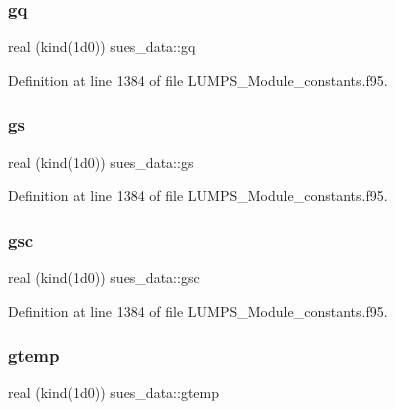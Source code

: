 \mbox{\label{namespacesues__data_a3ad79feef0770aefcae45775fa0c22c8}} 
\subsubsection{\texorpdfstring{gq}{gq}}
{\footnotesize\ttfamily real (kind(1d0)) sues\+\_\+data\+::gq}



Definition at line 1384 of file L\+U\+M\+P\+S\+\_\+\+Module\+\_\+constants.\+f95.

\mbox{\label{namespacesues__data_a5eb7587d26ec3542141102660d22dd33}} 
\subsubsection{\texorpdfstring{gs}{gs}}
{\footnotesize\ttfamily real (kind(1d0)) sues\+\_\+data\+::gs}



Definition at line 1384 of file L\+U\+M\+P\+S\+\_\+\+Module\+\_\+constants.\+f95.

\mbox{\label{namespacesues__data_a0aca98063df71052382d5ab58c2f0d19}} 
\subsubsection{\texorpdfstring{gsc}{gsc}}
{\footnotesize\ttfamily real (kind(1d0)) sues\+\_\+data\+::gsc}



Definition at line 1384 of file L\+U\+M\+P\+S\+\_\+\+Module\+\_\+constants.\+f95.

\mbox{\label{namespacesues__data_afdcda32590540b1055ac240cd92e9325}} 
\subsubsection{\texorpdfstring{gtemp}{gtemp}}
{\footnotesize\ttfamily real (kind(1d0)) sues\+\_\+data\+::gtemp}



